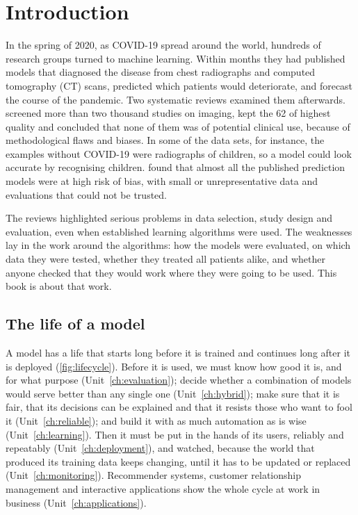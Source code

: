 \chapter*{Introduction}\label{ch:intro}

In the spring of 2020, as COVID-19 spread around the world, hundreds of research groups turned to machine
learning. Within months they had published models that diagnosed the disease from chest radiographs and computed tomography (CT)
scans, predicted which patients would deteriorate, and forecast the course of the pandemic. Two systematic
reviews examined them afterwards. \citet{roberts2021common} screened more than two thousand studies on imaging, kept
the 62 of highest quality and concluded that none of them was of potential clinical use, because of
methodological flaws and biases. In some of the data sets, for instance, the
examples without COVID-19 were radiographs of children, so a model could look accurate by recognising
children. \citet{wynants2020prediction} found that almost all the published prediction models were at high risk of bias, with
small or unrepresentative data and evaluations that could not be trusted.

The reviews highlighted serious problems in data selection, study design and evaluation, even when
established learning algorithms were used. The weaknesses lay in the work around the algorithms: how the models were evaluated, on which data they were
tested, whether they treated all patients alike, and whether anyone checked that they would work where
they were going to be used. This book is about that work.

\section*{The life of a model}

A model has a life that starts long before it is trained and continues long after it is deployed
(\cref{fig:lifecycle}). Before it is used, we must know how good it is, and for what purpose
(Unit~\ref{ch:evaluation}); decide whether a combination of models would serve better than any single one
(Unit~\ref{ch:hybrid}); make sure that it is fair, that its decisions can be explained and that it resists
those who want to fool it (Unit~\ref{ch:reliable}); and build it with as much automation as is wise
(Unit~\ref{ch:learning}). Then it must be put in the hands of its users, reliably and repeatably
(Unit~\ref{ch:deployment}), and watched, because the world that produced its training data keeps changing,
until it has to be updated or replaced (Unit~\ref{ch:monitoring}). Recommender systems, customer
relationship management and interactive applications show the whole cycle at work in business
(Unit~\ref{ch:applications}).

